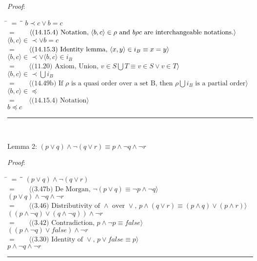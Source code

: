 \documentclass[12pt, fleqn, leqno]{article}
\newcommand{\lgap}{2pt}                             %
\newcommand{\mymathindent}{24pt}                    %
\newcommand{\myqed}{\rule[-.23ex]{1.2ex}{2.0ex}}
\newcommand{\myqedtab}{\hspace{384pt}}              %
\newcommand{\Gll} {\langle}                         %
\newcommand{\Ggg} {\rangle}                         %
\newcommand{\Hint}[1]     {\ \ \ $\Gll              \mbox{#1} \Ggg$ }   %
\begin{document}
\textit{Proof}:
\begin{tabbing}
\hspace{\mymathindent} \= $= \;$ \= \myqedtab \= \kill
	\> \>  $b \prec c \lor b = c$\\
	\> $=$  \>  \Hint{(14.15.4) Notation, $ \langle b, c \rangle \in \rho$ and $b \rho c$ are interchangeable notations.}\\[\lgap]
	\> \>   $ \langle b, c \rangle \in \prec \lor b = c$\\
	\> $=$  \>  \Hint{(14.15.3) Identity lemma, $ \langle x, y \rangle \in i_B \equiv x = y$}\\[\lgap]
	\> \>   $ \langle b, c \rangle \in \prec \lor \langle b, c \rangle \in i_B$\\
	\> $=$  \>  \Hint{(11.20) Axiom, Union, $v \in S \bigcup T \equiv v \in S \lor v \in T$}\\[\lgap]
	\> \>   $ \langle b, c \rangle \in \prec \bigcup i_B$\\
	\> $=$  \>  \Hint{(14.49b) If $\rho$ is a quasi order over a set B, then $\rho \bigcup i_B$ is a partial order}\\[\lgap]
	\> \>   $ \langle b, c \rangle \in \preceq$\\
	\> $=$  \>  \Hint{(14.15.4) Notation}\\[\lgap]
	\> \>   $b \preceq c$\quad \myqed\\
\end{tabbing}

Lemma 2: $(p \lor q) \land \lnot (q \lor r) \equiv p \land \lnot q \land \lnot r$

\textit{Proof}:
\begin{tabbing}
\hspace{\mymathindent} \= $= \;$ \= \myqedtab \= \kill
	\> \>  $(p \lor q) \land \lnot (q \lor r)$\\
	\> $=$  \>  \Hint{(3.47b) De Morgan, $\lnot (p \lor q) \equiv \lnot p \land \lnot q$}\\[\lgap]
	\> \>   $(p \lor q) \land \lnot q \land \lnot r$\\
	\> $=$  \>  \Hint{(3.46) Distributivity of $\land$ over $\lor$, $p \land (q \lor r) \equiv (p \land q) \lor (p\land r)$}\\[\lgap]
	\> \>   $((p \land \lnot q) \lor (q \land \lnot q)) \land \lnot r$\\
	\> $=$  \>  \Hint{(3.42) Contradiction, $p \land \lnot p \equiv false$}\\[\lgap]
	\> \>   $((p \land \lnot q) \lor false) \land \lnot r$\\
	\> $=$  \>  \Hint{(3.30) Identity of $\lor$, $p \lor false \equiv p$}\\[\lgap]
	\> \>   $p \land \lnot q \land \lnot r$ \quad \myqed\\
\end{tabbing}
\end{document}
